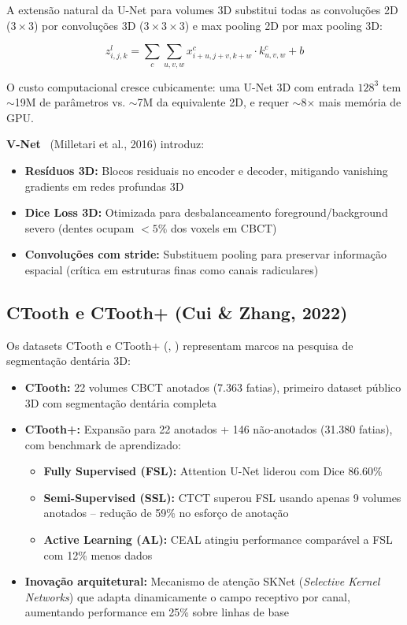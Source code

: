 A extensão natural da U-Net para volumes 3D substitui todas as convoluções 2D
($3 \times 3$) por convoluções 3D ($3 \times 3 \times 3$) e max pooling 2D
por max pooling 3D:

\begin{equation}
  z_{i,j,k}^{l} = \sum_{c} \sum_{u,v,w} x_{i+u, j+v, k+w}^{c} \cdot k_{u,v,w}^{c} + b
  \label{eq:conv3d}
\end{equation}

O custo computacional cresce cubicamente: uma U-Net 3D com entrada $128^3$ tem
$\sim$19M de parâmetros vs. $\sim$7M da equivalente 2D, e requer $\sim$8$\times$
mais memória de GPU.

\textbf{V-Net}~\cite{milletari2016vnet} (Milletari et al., 2016) introduz:
\begin{itemize}
  \item \textbf{Resíduos 3D:} Blocos residuais no encoder e decoder, mitigando
        vanishing gradients em redes profundas 3D
  \item \textbf{Dice Loss 3D:} Otimizada para desbalanceamento foreground/background
        severo (dentes ocupam $< 5\%$ dos voxels em CBCT)
  \item \textbf{Convoluções com stride:} Substituem pooling para preservar
        informação espacial (crítica em estruturas finas como canais radiculares)
\end{itemize}

\subsection{CTooth e CTooth+ (Cui \& Zhang, 2022)}

Os datasets CTooth e CTooth+ (, )
representam marcos na pesquisa de segmentação dentária 3D:

\begin{itemize}
  \item \textbf{CTooth:} 22 volumes CBCT anotados (7.363 fatias), primeiro
        dataset público 3D com segmentação dentária completa
  \item \textbf{CTooth+:} Expansão para 22 anotados + 146 não-anotados
        (31.380 fatias), com benchmark de aprendizado:
        \begin{itemize}
          \item \textbf{Fully Supervised (FSL):} Attention U-Net liderou com
                Dice 86.60\%
          \item \textbf{Semi-Supervised (SSL):} CTCT superou FSL usando apenas
                9 volumes anotados -- redução de 59\% no esforço de anotação
          \item \textbf{Active Learning (AL):} CEAL atingiu performance comparável
                a FSL com 12\% menos dados
        \end{itemize}
  \item \textbf{Inovação arquitetural:} Mecanismo de atenção SKNet (\textit{Selective
        Kernel Networks}) que adapta dinamicamente o campo receptivo por canal,
        aumentando performance em 25\% sobre linhas de base
\end{itemize}

